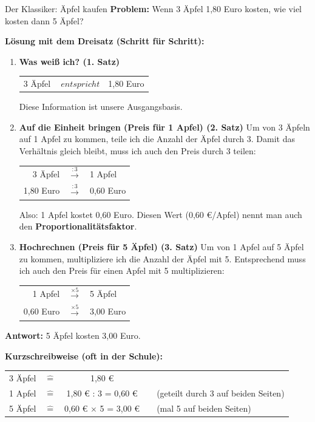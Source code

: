 \begin{beispielumgebung}[Apfelkauf]{Der Klassiker: Äpfel kaufen}
\textbf{Problem:} Wenn 3 Äpfel 1,80 Euro kosten, wie viel kosten dann 5 Äpfel?

\textbf{Lösung mit dem Dreisatz (Schritt für Schritt):}

\begin{enumerate}
    \item \textbf{Was weiß ich? (1. Satz)}
    \begin{tabular}{rcl}
        3 Äpfel & $\ entspricht $ & 1,80 Euro \\
    \end{tabular}
    Diese Information ist unsere Ausgangsbasis.

    \item \textbf{Auf die Einheit bringen (Preis für 1 Apfel) (2. Satz)}
    Um von 3 Äpfeln auf 1 Apfel zu kommen, teile ich die Anzahl der Äpfel durch 3. Damit das Verhältnis gleich bleibt, muss ich auch den Preis durch 3 teilen:
    \begin{tabular}{rcl}
        3 Äpfel & $\xrightarrow{:3}$ & 1 Apfel \\
        1,80 Euro & $\xrightarrow{:3}$ & 0,60 Euro \\
    \end{tabular}
    Also: 1 Apfel kostet 0,60 Euro. Diesen Wert (0,60 €/Apfel) nennt man auch den \textbf{Proportionalitätsfaktor}.

    \item \textbf{Hochrechnen (Preis für 5 Äpfel) (3. Satz)}
    Um von 1 Apfel auf 5 Äpfel zu kommen, multipliziere ich die Anzahl der Äpfel mit 5. Entsprechend muss ich auch den Preis für einen Apfel mit 5 multiplizieren:
    \begin{tabular}{rcl}
        1 Apfel & $\xrightarrow{\times 5}$ & 5 Äpfel \\
        0,60 Euro & $\xrightarrow{\times 5}$ & 3,00 Euro \\
    \end{tabular}
\end{enumerate}

\textbf{Antwort:} 5 Äpfel kosten 3,00 Euro.

\textbf{Kurzschreibweise (oft in der Schule):}
\begin{tabular}{rcccl}
    3 Äpfel & $\widehat{=}$ & 1,80 € & & \\
    1 Apfel & $\widehat{=}$ & 1,80 € : 3 = 0,60 € & & \small{(geteilt durch 3 auf beiden Seiten)} \\
    5 Äpfel & $\widehat{=}$ & 0,60 € $\times$ 5 = 3,00 € & & \small{(mal 5 auf beiden Seiten)} \\
\end{tabular}
\end{beispielumgebung}

